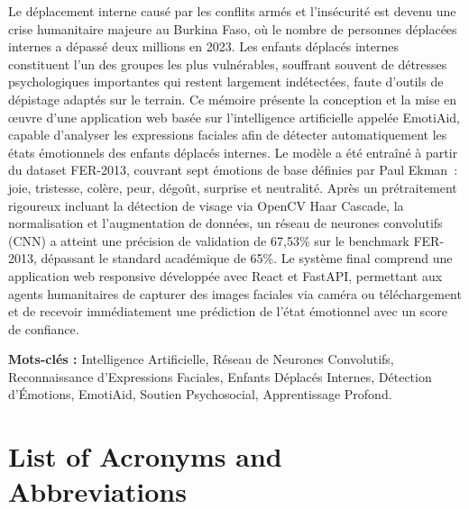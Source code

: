 \documentclass[a4paper,12pt,oneside]{report}
\begin{document}
Le d\'eplacement interne caus\'e par les conflits arm\'es et l'ins\'ecurit\'e
est devenu une crise humanitaire majeure au Burkina Faso, o\`u le nombre de
personnes d\'eplac\'ees internes a d\'epass\'e deux millions en 2023. Les
enfants d\'eplac\'es internes constituent l'un des groupes les plus vuln\'erables,
souffrant souvent de d\'etresses psychologiques importantes qui restent largement
ind\'etect\'ees, faute d'outils de d\'epistage adapt\'es sur le terrain. Ce
m\'emoire pr\'esente la conception et la mise en \oe{}uvre d'une application web
bas\'ee sur l'intelligence artificielle appel\'ee EmotiAid, capable d'analyser
les expressions faciales afin de d\'etecter automatiquement les \'etats
\'emotionnels des enfants d\'eplac\'es internes. Le mod\`ele a \'et\'e
entra\^in\'e \`a partir du dataset FER-2013, couvrant sept \'emotions de base
d\'efinies par Paul Ekman~: joie, tristesse, col\`ere, peur, d\'ego\^ut,
surprise et neutralit\'e. Apr\`es un pr\'etraitement rigoureux incluant la
d\'etection de visage via OpenCV Haar Cascade, la normalisation et l'augmentation
de donn\'ees, un r\'eseau de neurones convolutifs (CNN) a atteint une pr\'ecision
de validation de 67,53\% sur le benchmark FER-2013, d\'epassant le standard
acad\'emique de 65\%. Le syst\`eme final comprend une application web responsive
d\'evelopp\'ee avec React et FastAPI, permettant aux agents humanitaires de
capturer des images faciales via cam\'era ou t\'el\'echargement et de recevoir
imm\'ediatement une pr\'ediction de l'\'etat \'emotionnel avec un score de
confiance.

\vspace{0.5cm}
\noindent\textbf{Mots-cl\'es :} Intelligence Artificielle, R\'eseau de Neurones
Convolutifs, Reconnaissance d'Expressions Faciales, Enfants D\'eplac\'es
Internes, D\'etection d'\'Emotions, EmotiAid, Soutien Psychosocial,
Apprentissage Profond.
\clearpage

\begingroup
\renewcommand{\contentsname}{\Huge Table of Contents}
\setlength{\parskip}{5pt}
\tableofcontents
\endgroup
\clearpage

\section*{List of Acronyms and Abbreviations}
\renewcommand{\arraystretch}{1.3}
\end{document}
